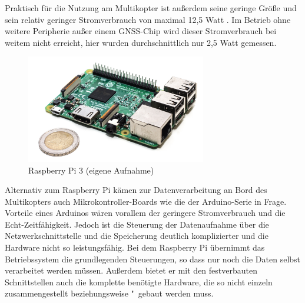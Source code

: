 \documentclass[a4paper,12pt,bibliography=totoc, listof=totoc,titlepage,pointlessnumbers]{scrreprt}
\begin{document}
Praktisch für die Nutzung am Multikopter ist außerdem seine geringe Größe und sein relativ geringer Stromverbrauch von maximal 12,5 Watt \citep{raspSheet}. Im Betrieb ohne weitere Peripherie außer einem GNSS-Chip wird dieser Stromverbrauch bei weitem nicht erreicht, hier wurden durchschnittlich nur 2,5 Watt gemessen.

\begin{figure}[!ht]
 \centering
 \includegraphics[width=0.7\textwidth]{./img/rpi3.jpg}
 \caption{Rasp\-berry Pi 3 (eigene Aufnahme)}
 \label{img:rpi3}
\end{figure}

Alternativ zum Raspberry Pi kämen zur Datenverarbeitung an Bord des Multikopters auch Mikrokontroller-Boards wie die der Arduino-Serie in Frage. Vorteile eines Arduinos wären vorallem der geringere Stromverbrauch und die Echt-Zeitfähigkeit. Jedoch ist die Steuerung der Datenaufnahme über die Netzwerkschnittstelle und die Speicherung deutlich komplizierter und die Hardware nicht so leistungsfähig. Bei dem Rasp\-berry Pi übernimmt das Betriebssystem die grundlegenden Steuerungen, so dass nur noch die Daten selbst verarbeitet werden müssen. Außerdem bietet er mit den festverbauten Schnittstellen auch die komplette benötigte Hardware, die so nicht einzeln zusammengestellt beziehungsweise "~gebaut werden muss.
\end{document}
